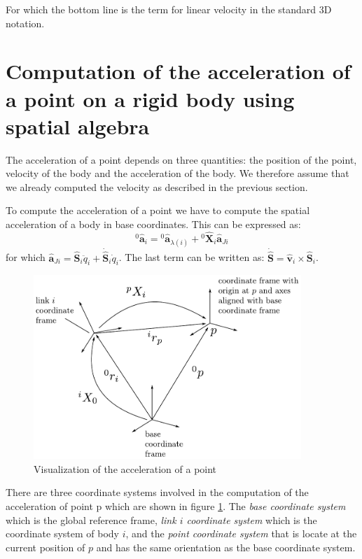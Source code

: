 \documentclass[a4paper]{article}
\newcommand{\Spa}[1]{\mathbf{\hat{#1}}}
\begin{document}
For which the bottom line is the term for linear velocity in the standard 3D
notation.

\section{Computation of the acceleration of a point on a rigid body using
spatial algebra}

The acceleration of a point depends on three quantities: the position of the
point, velocity of the body and the acceleration of the body. We therefore
assume that we already computed the velocity as described in the previous
section.

To compute the acceleration of a point we have to compute the spatial
acceleration of a body in base coordinates. This can be expressed as:
\begin{equation}
	{}^0\Spa{a}_i = {}^0\Spa{a}_{\lambda(i)}
	+ {}^{0}\Spa{X}_{i} \Spa{a}_{Ji}
\end{equation}
for which $\Spa{a}_{Ji} = \Spa{S}_i \ddot{q}_i + \dot{\Spa{S}}_i \dot{q}_i$.
The last term can be written as: $\dot{\Spa{S}} = \Spa{v}_i \times \Spa{S}_i$.

\begin{figure}[h!]
	\begin{center}
		\includegraphics[width=0.9\textwidth]{acceleration_visualization}
	\end{center}
	\caption{Visualization of the acceleration of a point}
	\label{fig:acceleration_visualization}
\end{figure}

There are three coordinate systems involved in the computation of the
acceleration of point p which are shown in figure
\ref{fig:acceleration_visualization}. The \emph{base coordinate system} which
is the global reference frame, \emph{link $i$ coordinate system} which is the
coordinate system of body $i$, and the \emph{point coordinate system} that is
locate at the current position of $p$ and has the same orientation as the base
coordinate system.
\end{document}
